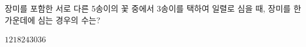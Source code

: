 장미를 포함한 서로 다른 5송이의 꽃 중에서 3송이를 택하여 일렬로 심을 때, 장미를 한가운데에 심는 경우의 수는?
\begin{choices32}{$12$}{$18$}{$24$}{$30$}{$36$}\end{choices32}
